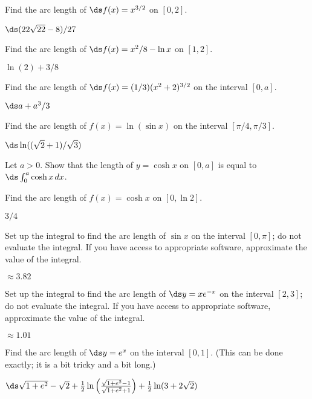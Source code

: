 \begin{exercises}

\exercise Find the arc length of $\ds f(x)=x^{3/2}$ on $[0,2]$.
\begin{answer} $\ds (22\sqrt{22}-8)/27$
\end{answer}

\exercise Find the arc length of $\ds f(x) = x^2/8-\ln x$
on $[1,2]$.
\begin{answer} $\ln(2)+3/8$
\end{answer}

\exercise
Find the arc length of $\ds f(x) = (1/3)(x^2 +2)^{3/2}$
on the interval $[0,a]$.
\begin{answer} $\ds a+a^3/3$
\end{answer}

\exercise Find the arc length of $f(x)=\ln(\sin x)$ on the
interval $[\pi/4,\pi/3]$.
\begin{answer} $\ds \ln((\sqrt2+1)/\sqrt3)$
\end{answer}

\exercise Let $a>0$. Show that the length of $y=\cosh x$ on
$[0,a]$ is equal to $\ds \int _0 ^a \cosh x\,dx$.

\exercise Find the arc length of $f(x)=\cosh x$ on $[0, \ln 2]$.
\begin{answer} $3/4$
\end{answer}

\exercise Set up the integral to find the arc length of $\sin x$ 
on the interval $[0,\pi]$; do not evaluate the integral. If you have
access to appropriate software, approximate the value of the integral.
\begin{answer} $\approx 3.82$
\end{answer}

\exercise Set up the integral to find the arc length of $\ds y=xe^{-x}$
on the interval $[2,3]$; do not evaluate the integral. If you have
access to appropriate software, approximate the value of the integral.
\begin{answer} $\approx 1.01$
\end{answer}

\exercise Find the arc length of $\ds y=e^x$ on the interval $[0,1]$.
(This can be done exactly; it is a bit tricky and a bit long.)
\begin{answer} $\ds \sqrt{1+e^2}-\sqrt2+
{1\over2}\ln\left({\sqrt{1+e^2}-1\over\sqrt{1+e^2}+1}\right)+
{1\over2}\ln(3+2\sqrt2)$
\end{answer}

\end{exercises}
